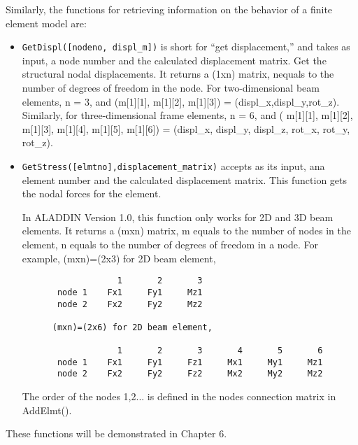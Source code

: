 \vspace{0.15 in}\noindent
Similarly, the functions for retrieving information on the
behavior of a finite element model are:

\begin{itemize}
\item{}
{\tt GetDispl([nodeno, displ\_m])} is short for ``get displacement,''
and takes as input, a node number and the calculated displacement matrix.
Get the structural nodal displacements.
It returns a (1xn) matrix, nequals to the number of degrees of freedom in the node.
For two-dimensional beam elements, n = 3, and
(m[1][1], m[1][2], m[1][3]) = (displ\_x,displ\_y,rot\_z).
Similarly, for three-dimensional frame elements, n = 6,
and ( m[1][1], m[1][2], m[1][3], m[1][4], m[1][5], m[1][6]) =
(displ\_x, displ\_y, displ\_z, rot\_x, rot\_y, rot\_z).

\item{}
{\tt GetStress([elmtno],displacement\_matrix)} accepts as its input, ana element number
and the calculated displacement matrix.
This function gets the nodal forces for the element.

\vspace{0.15 in}
In ALADDIN Version 1.0, this function only works for 2D and 3D beam elements.
It returns a (mxn) matrix, m equals to the number of nodes in the element,
n equals to the number of degrees of freedom in a node.
For example, (mxn)=(2x3) for 2D beam element,

\begin{footnotesize}
\begin{verbatim}
                   1       2       3
       node 1    Fx1     Fy1     Mz1
       node 2    Fx2     Fy2     Mz2

      (mxn)=(2x6) for 2D beam element,

                   1       2       3       4       5       6
       node 1    Fx1     Fy1     Fz1     Mx1     My1     Mz1
       node 2    Fx2     Fy2     Fz2     Mx2     My2     Mz2
\end{verbatim}
\end{footnotesize}

\vspace{0.15 in}
The order of the nodes 1,2... is defined in the nodes connection matrix in AddElmt().
\end{itemize}

\vspace{0.15 in}\noindent
These functions will be demonstrated in Chapter 6.

